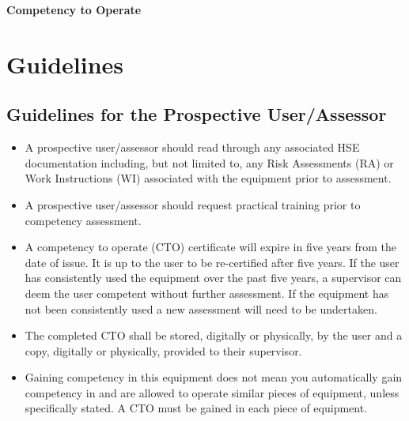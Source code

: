 \documentclass[11pt, a4paper, titlepage]{article}
\begin{document}
    \noindent
    \huge{\textbf{Competency to Operate}} \\
    \huge{\textbf{\Title}}

    \normalsize
    \section{Guidelines}
    \subsection{Guidelines for the Prospective User/Assessor}
    \begin{itemize}[noitemsep]
        \item A prospective user/assessor should read through any associated HSE documentation including, but not limited to, any Risk Assessments (RA) or Work Instructions (WI) associated with the equipment prior to assessment.
        \item A prospective user/assessor should request practical training prior to competency assessment.
        \item A competency to operate (CTO) certificate will expire in five years from the date of issue. It is up to the user to be re-certified after five years. If the user has consistently used the equipment over the past five years, a supervisor can deem the user competent without further assessment. If the equipment has not been consistently used a new assessment will need to be undertaken.
        \item The completed CTO shall be stored, digitally or physically, by the user and a copy, digitally or physically, provided to their supervisor.
        \item Gaining competency in this equipment does not mean you automatically gain competency in and are allowed to operate similar pieces of equipment, unless specifically stated. A CTO must be gained in each piece of equipment.
    \end{itemize}
\end{document}
